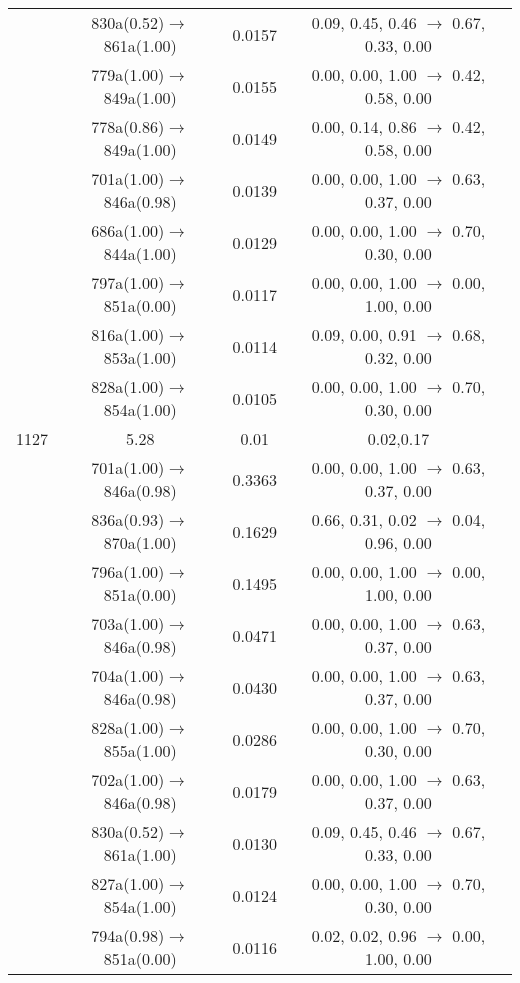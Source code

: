 \documentclass[10pt,a4paper]{article}
\begin{document}
\begin{longtable}{c|c|c|c}
 	& 830a(0.52)$\rightarrow$861a(1.00) &	 0.0157 &	 0.09, 0.45, 0.46 $\rightarrow$ 0.67, 0.33, 0.00 \\ 
 	& 779a(1.00)$\rightarrow$849a(1.00) &	 0.0155 &	 0.00, 0.00, 1.00 $\rightarrow$ 0.42, 0.58, 0.00 \\ 
 	& 778a(0.86)$\rightarrow$849a(1.00) &	 0.0149 &	 0.00, 0.14, 0.86 $\rightarrow$ 0.42, 0.58, 0.00 \\ 
 	& 701a(1.00)$\rightarrow$846a(0.98) &	 0.0139 &	 0.00, 0.00, 1.00 $\rightarrow$ 0.63, 0.37, 0.00 \\ 
 	& 686a(1.00)$\rightarrow$844a(1.00) &	 0.0129 &	 0.00, 0.00, 1.00 $\rightarrow$ 0.70, 0.30, 0.00 \\ 
 	& 797a(1.00)$\rightarrow$851a(0.00) &	 0.0117 &	 0.00, 0.00, 1.00 $\rightarrow$ 0.00, 1.00, 0.00 \\ 
 	& 816a(1.00)$\rightarrow$853a(1.00) &	 0.0114 &	 0.09, 0.00, 0.91 $\rightarrow$ 0.68, 0.32, 0.00 \\ 
 	& 828a(1.00)$\rightarrow$854a(1.00) &	 0.0105 &	 0.00, 0.00, 1.00 $\rightarrow$ 0.70, 0.30, 0.00 \\ 
 \hline1127 &	 5.28 &	 0.01 &	 0.02,0.17 \\ 
  	& 701a(1.00)$\rightarrow$846a(0.98) &	 0.3363 &	 0.00, 0.00, 1.00 $\rightarrow$ 0.63, 0.37, 0.00 \\ 
 	& 836a(0.93)$\rightarrow$870a(1.00) &	 0.1629 &	 0.66, 0.31, 0.02 $\rightarrow$ 0.04, 0.96, 0.00 \\ 
 	& 796a(1.00)$\rightarrow$851a(0.00) &	 0.1495 &	 0.00, 0.00, 1.00 $\rightarrow$ 0.00, 1.00, 0.00 \\ 
 	& 703a(1.00)$\rightarrow$846a(0.98) &	 0.0471 &	 0.00, 0.00, 1.00 $\rightarrow$ 0.63, 0.37, 0.00 \\ 
 	& 704a(1.00)$\rightarrow$846a(0.98) &	 0.0430 &	 0.00, 0.00, 1.00 $\rightarrow$ 0.63, 0.37, 0.00 \\ 
 	& 828a(1.00)$\rightarrow$855a(1.00) &	 0.0286 &	 0.00, 0.00, 1.00 $\rightarrow$ 0.70, 0.30, 0.00 \\ 
 	& 702a(1.00)$\rightarrow$846a(0.98) &	 0.0179 &	 0.00, 0.00, 1.00 $\rightarrow$ 0.63, 0.37, 0.00 \\ 
 	& 830a(0.52)$\rightarrow$861a(1.00) &	 0.0130 &	 0.09, 0.45, 0.46 $\rightarrow$ 0.67, 0.33, 0.00 \\ 
 	& 827a(1.00)$\rightarrow$854a(1.00) &	 0.0124 &	 0.00, 0.00, 1.00 $\rightarrow$ 0.70, 0.30, 0.00 \\ 
 	& 794a(0.98)$\rightarrow$851a(0.00) &	 0.0116 &	 0.02, 0.02, 0.96 $\rightarrow$ 0.00, 1.00, 0.00 \\ 

\end{longtable}
\end{document}
